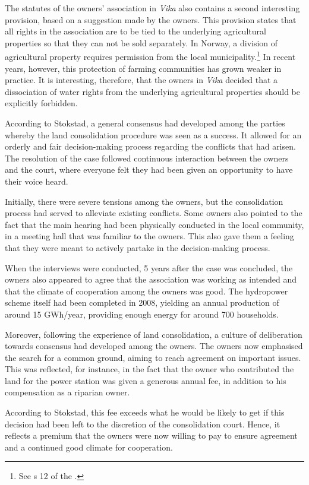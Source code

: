 The statutes of the owners' association in {\it Vika} also contains a second interesting provision, based on a suggestion made by the owners. This provision states that all rights in the association are to be tied to the underlying agricultural properties so that they can not be sold separately. In Norway, a division of agricultural property requires permission from the local municipality.\footnote{See s 12 of the \cite{la95}.} In recent years, however, this protection of farming communities has grown weaker in practice. It is interesting, therefore, that the owners in \emph{Vika} decided that a dissociation of water rights from the underlying agricultural properties should be explicitly forbidden.

According to Stokstad, a general consensus had developed among the parties whereby the land consolidation procedure was seen as a success. It allowed for an orderly and fair decision-making process regarding the conflicts that had arisen. The resolution of the case followed continuous interaction between the owners and the court, where everyone felt they had been given an opportunity to have their voice heard. 

Initially, there were severe tensions among the owners, but the consolidation process had served to alleviate existing conflicts. Some owners also pointed to the fact that the main hearing had been physically conducted in the local community, in a meeting hall that was familiar to the owners. This also gave them a feeling that they were meant to actively partake in the decision-making process. 

When the interviews were conducted, 5 years after the case was concluded, the owners also appeared to agree that the association was working as intended and that the climate of cooperation among the owners was good. The hydropower scheme itself had been completed in 2008, yielding an annual production of around 15 GWh/year, providing enough energy for around 700 households. 

Moreover, following the experience of land consolidation, a culture of deliberation towards consensus had developed among the owners. The owners now emphasised the search for a common ground, aiming to reach agreement on important issues. This was reflected, for instance, in the fact that the owner who contributed the land for the power station was given a generous annual fee, in addition to his compensation as a riparian owner. 

According to Stokstad, this fee exceeds what he would be likely to get if this decision had been left to the discretion of the consolidation court. Hence, it reflects a premium that the owners were now willing to pay to ensure agreement and a continued good climate for cooperation.

